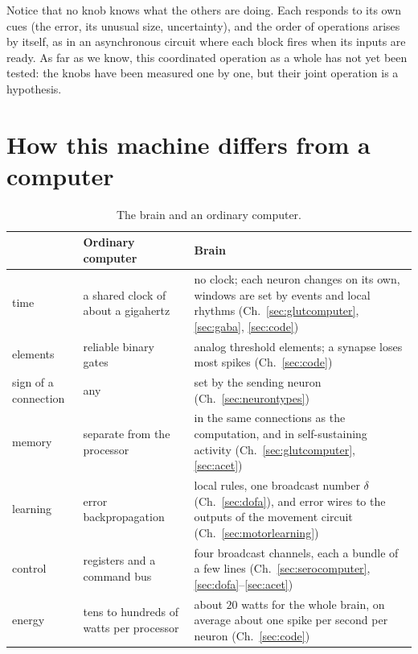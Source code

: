 Notice that no knob knows what the others are doing. Each responds to its own cues (the error, its unusual size, uncertainty), and the order of operations arises by itself, as in an asynchronous circuit where each block fires when its inputs are ready. As far as we know, this coordinated operation as a whole has not yet been tested: the knobs have been measured one by one, but their joint operation is a hypothesis.

\section{How this machine differs from a computer}

\begin{table}[t]
\centering
\footnotesize
\setlength{\tabcolsep}{4pt}
\renewcommand{\arraystretch}{1.15}
\begin{tabular}{>{\raggedright}p{2.2cm}>{\raggedright}p{4.2cm}>{\raggedright\arraybackslash}p{6.6cm}}
\toprule
& Ordinary computer & Brain \\
\midrule
time & a shared clock of about a gigahertz & no clock; each neuron changes on its own, windows are set by events and local rhythms (Ch.~\ref{sec:glutcomputer}, \ref{sec:gaba}, \ref{sec:code}) \\
elements & reliable binary gates & analog threshold elements; a synapse loses most spikes (Ch.~\ref{sec:code}) \\
sign of a connection & any & set by the sending neuron (Ch.~\ref{sec:neurontypes}) \\
memory & separate from the processor & in the same connections as the computation, and in self-sustaining activity (Ch.~\ref{sec:glutcomputer}, \ref{sec:acet}) \\
learning & error backpropagation & local rules, one broadcast number $\delta$ (Ch.~\ref{sec:dofa}), and error wires to the outputs of the movement circuit (Ch.~\ref{sec:motorlearning}) \\
control & registers and a command bus & four broadcast channels, each a bundle of a few lines (Ch.~\ref{sec:serocomputer}, \ref{sec:dofa}--\ref{sec:acet}) \\
energy & tens to hundreds of watts per processor & about $20$ watts for the whole brain, on average about one spike per second per neuron (Ch.~\ref{sec:code}) \\
\bottomrule
\end{tabular}
\caption{The brain and an ordinary computer.}
\label{tab:computer}
\end{table}

